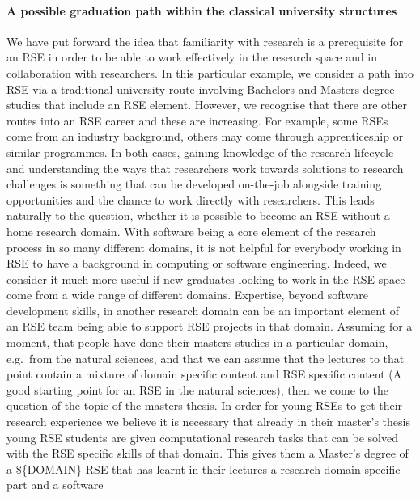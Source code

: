 \documentclass[a4paper
]{article}
\begin{document}
\hypertarget{a-possible-graduation-path-within-the-classical-university-structures}{%
\paragraph{A possible graduation path within the classical university
structures}\label{a-possible-graduation-path-within-the-classical-university-structures}}

We have put forward the idea that familiarity with research is a
prerequisite for an RSE in order to be able to work effectively in the
research space and in collaboration with researchers. In this particular
example, we consider a path into RSE via a traditional university route
involving Bachelors and Masters degree studies that include an RSE
element. However, we recognise that there are other routes into an RSE
career and these are increasing. For example, some RSEs come from an
industry background, others may come through apprenticeship or similar
programmes. In both cases, gaining knowledge of the research lifecycle
and understanding the ways that researchers work towards solutions to
research challenges is something that can be developed on-the-job
alongside training opportunities and the chance to work directly with
researchers. This leads naturally to the question, whether it is
possible to become an RSE without a home research domain. With software
being a core element of the research process in so many different
domains, it is not helpful for everybody working in RSE to have a
background in computing or software engineering. Indeed, we consider it
much more useful if new graduates looking to work in the RSE space come
from a wide range of different domains. Expertise, beyond software
development skills, in another research domain can be an important
element of an RSE team being able to support RSE projects in that
domain. Assuming for a moment, that people have done their masters
studies in a particular domain, e.g.~from the natural sciences, and that
we can assume that the lectures to that point contain a mixture of
domain specific content and RSE specific content (A good starting point
for an RSE in the natural sciences), then we come to the question of the
topic of the masters thesis. In order for young RSEs to get their
research experience we believe it is necessary that already in their
master's thesis young RSE students are given computational research
tasks that can be solved with the RSE specific skills of that domain.
This gives them a Master's degree of a \$\{DOMAIN\}-RSE that has learnt
in their lectures a research domain specific part and a software
\end{document}
